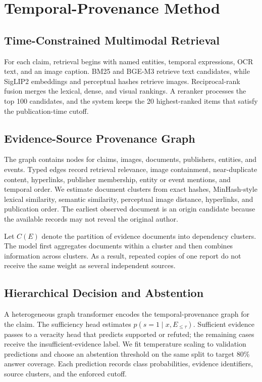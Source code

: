 \section{Temporal-Provenance Method}

\subsection{Time-Constrained Multimodal Retrieval}

For each claim, retrieval begins with named entities, temporal expressions, OCR text, and an image caption. BM25 and BGE-M3 retrieve text candidates, while SigLIP2 embeddings and perceptual hashes retrieve images. Reciprocal-rank fusion merges the lexical, dense, and visual rankings. A reranker processes the top 100 candidates, and the system keeps the 20 highest-ranked items that satisfy the publication-time cutoff.

\subsection{Evidence-Source Provenance Graph}

The graph contains nodes for claims, images, documents, publishers, entities, and events. Typed edges record retrieval relevance, image containment, near-duplicate content, hyperlinks, publisher membership, entity or event mentions, and temporal order. We estimate document clusters from exact hashes, MinHash-style lexical similarity, semantic similarity, perceptual image distance, hyperlinks, and publication order. The earliest observed document is an origin candidate because the available records may not reveal the original author.

Let $C(E)$ denote the partition of evidence documents into dependency clusters. The model first aggregates documents within a cluster and then combines information across clusters. As a result, repeated copies of one report do not receive the same weight as several independent sources.

\subsection{Hierarchical Decision and Abstention}

A heterogeneous graph transformer encodes the temporal-provenance graph for the claim. The sufficiency head estimates $p(s=1\mid x,E_{\leq\tau})$. Sufficient evidence passes to a veracity head that predicts supported or refuted; the remaining cases receive the insufficient-evidence label. We fit temperature scaling to validation predictions and choose an abstention threshold on the same split to target 80\% answer coverage. Each prediction records class probabilities, evidence identifiers, source clusters, and the enforced cutoff.

